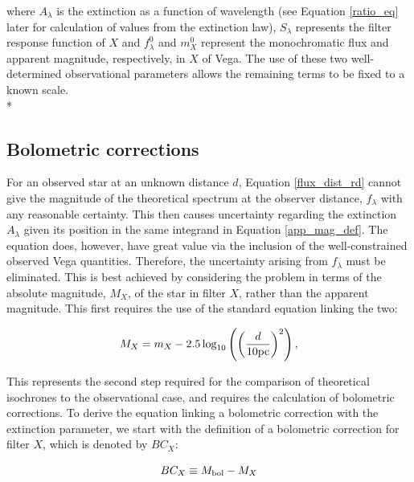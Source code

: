 \documentclass[12pt, a4paper]{report}
\begin{document}
where $A_{\lambda}$ is the extinction as a function of wavelength (see Equation \ref{ratio_eq} later for calculation of values from the \cite{1989ApJ...345..245C} extinction law), $S_{\lambda}$ represents the filter response function of $X$ and $f_{\lambda}^{0}$ and $m_{X}^{0}$ represent the monochromatic flux and apparent magnitude, respectively, in $X$ of Vega. The use of these two well-determined observational parameters allows the remaining terms to be fixed to a known scale.\\*

\subsection{Bolometric corrections}

For an observed star at an unknown distance $d$, Equation \ref{flux_dist_rd} cannot give the magnitude of the theoretical spectrum at the observer distance, $f_{\lambda}$ with any reasonable certainty. This then causes uncertainty regarding the extinction $A_{\lambda}$ given its position in the same integrand in Equation \ref{app_mag_def}. The equation does, however, have great value via the inclusion of the well-constrained observed Vega quantities. Therefore, the uncertainty arising from $f_{\lambda}$ must be eliminated. This is best achieved by considering the problem in terms of the absolute magnitude, $M_{X}$, of the star in filter $X$, rather than the apparent magnitude. This first requires the use of the standard equation linking the two:

\begin{equation}
M_{X} = m_{X} - 2.5 \log_{10}\left( \left( \frac{d}{10 \textnormal{pc}} \right)^{2} \right),
\label{abs_mag_def}
\end{equation}

This represents the second step required for the comparison of theoretical isochrones to the observational case, and requires the calculation of bolometric corrections. To derive the equation linking a bolometric correction with the extinction parameter, we start with the definition of a bolometric correction for filter $X$, which is denoted by $BC_{X}$:

\begin{equation}
BC_{X} \equiv M_{\textnormal{bol}} - M_{X}
\label{BC_def}
\end{equation}
\end{document}
